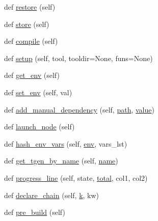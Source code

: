 \begin{DoxyCompactItemize}
\item 
def \hyperlink{classwaflib_1_1_build_1_1_build_context_a9222c95f85009e82a95a4a8cbe2df934}{restore} (self)
\item 
def \hyperlink{classwaflib_1_1_build_1_1_build_context_ae39e78bf8a49550451ed42b0467fa9d5}{store} (self)
\item 
def \hyperlink{classwaflib_1_1_build_1_1_build_context_af7d834423f8c49384edaf3dbaa8c912e}{compile} (self)
\item 
def \hyperlink{classwaflib_1_1_build_1_1_build_context_ad26165fd9d32fe212a94936da03066c1}{setup} (self, tool, tooldir=None, funs=None)
\item 
def \hyperlink{classwaflib_1_1_build_1_1_build_context_a39240d22a6d298b74dabc40d8fb193a8}{get\+\_\+env} (self)
\item 
def \hyperlink{classwaflib_1_1_build_1_1_build_context_a8605b754128e554773a5962b55ec0741}{set\+\_\+env} (self, val)
\item 
def \hyperlink{classwaflib_1_1_build_1_1_build_context_aa550cf2655c922455d53077b4f1e4be1}{add\+\_\+manual\+\_\+dependency} (self, \hyperlink{classwaflib_1_1_build_1_1_build_context_afe3db622272692d0069d8b0f66c54a2c}{path}, \hyperlink{lib_2expat_8h_a4a30a13b813682e68c5b689b45c65971}{value})
\item 
def \hyperlink{classwaflib_1_1_build_1_1_build_context_a5ec1b12e273a3fcd437fd1e61292e8a1}{launch\+\_\+node} (self)
\item 
def \hyperlink{classwaflib_1_1_build_1_1_build_context_a4df53c421fdd1ea43eacfe0ec268fb07}{hash\+\_\+env\+\_\+vars} (self, \hyperlink{classwaflib_1_1_build_1_1_build_context_ac3b464a969bc6c898c739b6d820b2219}{env}, vars\+\_\+lst)
\item 
def \hyperlink{classwaflib_1_1_build_1_1_build_context_a158dba08b64d4a73b21a907ebe577017}{get\+\_\+tgen\+\_\+by\+\_\+name} (self, \hyperlink{lib_2expat_8h_a1b49b495b59f9e73205b69ad1a2965b0}{name})
\item 
def \hyperlink{classwaflib_1_1_build_1_1_build_context_af6341267231cfa8cabdfd595aede71fc}{progress\+\_\+line} (self, state, \hyperlink{classwaflib_1_1_build_1_1_build_context_a9242bac9596041fb6e91bd4f7cdbac51}{total}, col1, col2)
\item 
def \hyperlink{classwaflib_1_1_build_1_1_build_context_a6d24341f3d68e2a5a3987300d3d017fa}{declare\+\_\+chain} (self, \hyperlink{rfft2d_test_m_l_8m_adc468c70fb574ebd07287b38d0d0676d}{k}, kw)
\item 
def \hyperlink{classwaflib_1_1_build_1_1_build_context_a31b06f39986abefe3e129998b079f679}{pre\+\_\+build} (self)

\end{DoxyCompactItemize}
